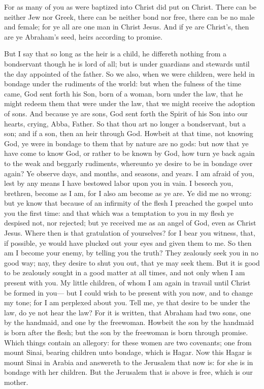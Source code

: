 For as many of you as were baptized into Christ did put on Christ. There can be neither Jew nor Greek, there can be neither bond nor free, there can be no male and female; for ye all are one man in Christ Jesus. And if ye are Christ’s, then are ye Abraham’s seed, heirs according to promise. 

But I say that so long as the heir is a child, he differeth nothing from a bondservant though he is lord of all; but is under guardians and stewards until the day appointed of the father. So we also, when we were children, were held in bondage under the rudiments of the world: but when the fulness of the time came, God sent forth his Son, born of a woman, born under the law, that he might redeem them that were under the law, that we might receive the adoption of sons. And because ye are sons, God sent forth the Spirit of his Son into our hearts, crying, Abba, Father. So that thou art no longer a bondservant, but a son; and if a son, then an heir through God.  Howbeit at that time, not knowing God, ye were in bondage to them that by nature are no gods: but now that ye have come to know God, or rather to be known by God, how turn ye back again to the weak and beggarly rudiments, whereunto ye desire to be in bondage over again? Ye observe days, and months, and seasons, and years. I am afraid of you, lest by any means I have bestowed labor upon you in vain.  I beseech you, brethren, become as I am, for I also am become as ye are. Ye did me no wrong: but ye know that because of an infirmity of the flesh I preached the gospel unto you the first time: and that which was a temptation to you in my flesh ye despised not, nor rejected; but ye received me as an angel of God, even as Christ Jesus. Where then is that gratulation of yourselves? for I bear you witness, that, if possible, ye would have plucked out your eyes and given them to me. So then am I become your enemy, by telling you the truth? They zealously seek you in no good way; nay, they desire to shut you out, that ye may seek them. But it is good to be zealously sought in a good matter at all times, and not only when I am present with you. My little children, of whom I am again in travail until Christ be formed in you— but I could wish to be present with you now, and to change my tone; for I am perplexed about you.  Tell me, ye that desire to be under the law, do ye not hear the law? For it is written, that Abraham had two sons, one by the handmaid, and one by the freewoman. Howbeit the son by the handmaid is born after the flesh; but the son by the freewoman is born through promise. Which things contain an allegory: for these women are two covenants; one from mount Sinai, bearing children unto bondage, which is Hagar. Now this Hagar is mount Sinai in Arabia and answereth to the Jerusalem that now is: for she is in bondage with her children. But the Jerusalem that is above is free, which is our mother. 